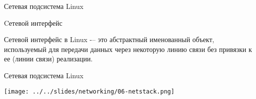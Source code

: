 \begin{frame}{Сетевая подсистема Linux}

	\begin{block}{Cетевой интерфейс}

		Сетевой интерфейс в Linux -– это абстрактный \alert{именованный} объект,  используемый для передачи 
		данных через некоторую линию связи без привязки к ее (линии связи) реализации.
	\end{block}
\end{frame}

\begin{frame}{Сетевая подсистема Linux}

	\center\texttt{[image: ../../slides/networking/06-netstack.png]}

\end{frame}


